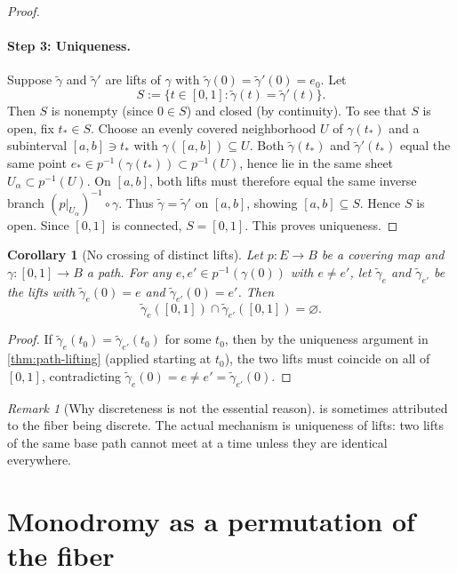 \documentclass[11pt,a4paper]{article}
\newtheorem{corollary}[theorem]{Corollary}
\theoremstyle{definition}
\theoremstyle{remark}
\newtheorem{remark}[theorem]{Remark}
\begin{document}
\begin{proof}
\paragraph{Step 3: Uniqueness.}
Suppose \(\tilde\gamma\) and \(\tilde\gamma'\) are lifts of \(\gamma\) with \(\tilde\gamma(0)=\tilde\gamma'(0)=e_0\). Let
\[
S:=\{t\in[0,1]: \tilde\gamma(t)=\tilde\gamma'(t)\}.
\]
Then \(S\) is nonempty (since \(0\in S\)) and closed (by continuity). To see that \(S\) is open, fix \(t_*\in S\). Choose an evenly covered neighborhood \(U\) of \(\gamma(t_*)\) and a subinterval \([a,b]\ni t_*\) with \(\gamma([a,b])\subseteq U\). Both \(\tilde\gamma(t_*)\) and \(\tilde\gamma'(t_*)\) equal the same point \(e_* \in p^{-1}(\gamma(t_*))\subset p^{-1}(U)\), hence lie in the same sheet \(U_\alpha\subset p^{-1}(U)\). On \([a,b]\), both lifts must therefore equal the same inverse branch \((p|_{U_\alpha})^{-1}\circ \gamma\). Thus \(\tilde\gamma=\tilde\gamma'\) on \([a,b]\), showing \([a,b]\subseteq S\). Hence \(S\) is open.
Since \([0,1]\) is connected, \(S=[0,1]\). This proves uniqueness.
\end{proof}

\begin{corollary}[No crossing of distinct lifts]
\label{cor:no-crossing}
Let \(p:E\to B\) be a covering map and \(\gamma:[0,1]\to B\) a path. For any \(e,e'\in p^{-1}(\gamma(0))\) with \(e\neq e'\), let \(\tilde\gamma_e\) and \(\tilde\gamma_{e'}\) be the lifts with \(\tilde\gamma_e(0)=e\) and \(\tilde\gamma_{e'}(0)=e'\). Then
\[
\tilde\gamma_e([0,1])\cap \tilde\gamma_{e'}([0,1])=\varnothing.
\]
\end{corollary}

\begin{proof}
If \(\tilde\gamma_e(t_0)=\tilde\gamma_{e'}(t_0)\) for some \(t_0\), then by the uniqueness argument in \cref{thm:path-lifting} (applied starting at \(t_0\)), the two lifts must coincide on all of \([0,1]\), contradicting \(\tilde\gamma_e(0)=e\neq e'=\tilde\gamma_{e'}(0)\).
\end{proof}

\begin{remark}[Why discreteness is not the essential reason]
\label{rem:not-discrete-reason}
 is sometimes attributed to the fiber being discrete. The actual mechanism is uniqueness of lifts: two lifts of the same base path cannot meet at a time unless they are identical everywhere.
\end{remark}

\section{Monodromy as a permutation of the fiber}
\label{sec:monodromy}
\end{document}
